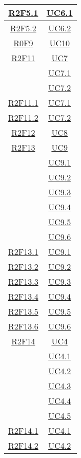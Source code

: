 \begin{longtable}{|c|c|}
\hline
\hyperlink{R2F5.1}{R2F5.1} & \hyperlink{UC6.1}{UC6.1}\\
\hline
\hyperlink{R2F5.2}{R2F5.2} & \hyperlink{UC6.2}{UC6.2}\\
\hline
\hyperlink{R0F9}{R0F9} & \hyperlink{UC10}{UC10}\\
\hline
\hyperlink{R2F11}{R2F11} & \hyperlink{UC7}{UC7}\\
& \hyperlink{UC7.1}{UC7.1}\\
& \hyperlink{UC7.2}{UC7.2}\\
\hline
\hyperlink{R2F11.1}{R2F11.1} & \hyperlink{UC7.1}{UC7.1}\\
\hline
\hyperlink{R2F11.2}{R2F11.2} & \hyperlink{UC7.2}{UC7.2}\\
\hline
\hyperlink{R2F12}{R2F12} & \hyperlink{UC8}{UC8}\\
\hline
\hyperlink{R2F13}{R2F13} & \hyperlink{UC9}{UC9}\\
& \hyperlink{UC9.1}{UC9.1}\\
& \hyperlink{UC9.2}{UC9.2}\\
& \hyperlink{UC9.3}{UC9.3}\\
& \hyperlink{UC9.4}{UC9.4}\\
& \hyperlink{UC9.5}{UC9.5}\\
& \hyperlink{UC9.6}{UC9.6}\\
\hline
\hyperlink{R2F13.1}{R2F13.1} & \hyperlink{UC9.1}{UC9.1}\\
\hline
\hyperlink{R2F13.2}{R2F13.2} & \hyperlink{UC9.2}{UC9.2}\\
\hline
\hyperlink{R2F13.3}{R2F13.3} & \hyperlink{UC9.3}{UC9.3}\\
\hline
\hyperlink{R2F13.4}{R2F13.4} & \hyperlink{UC9.4}{UC9.4}\\
\hline
\hyperlink{R2F13.5}{R2F13.5} & \hyperlink{UC9.5}{UC9.5}\\
\hline
\hyperlink{R2F13.6}{R2F13.6} & \hyperlink{UC9.6}{UC9.6}\\
\hline
\hyperlink{R2F14}{R2F14} & \hyperlink{UC4}{UC4}\\
& \hyperlink{UC4.1}{UC4.1}\\
& \hyperlink{UC4.2}{UC4.2}\\
& \hyperlink{UC4.3}{UC4.3}\\
& \hyperlink{UC4.4}{UC4.4}\\
& \hyperlink{UC4.5}{UC4.5}\\
\hline
\hyperlink{R2F14.1}{R2F14.1} & \hyperlink{UC4.1}{UC4.1}\\
\hline
\hyperlink{R2F14.2}{R2F14.2} & \hyperlink{UC4.2}{UC4.2}\\

\end{longtable}
